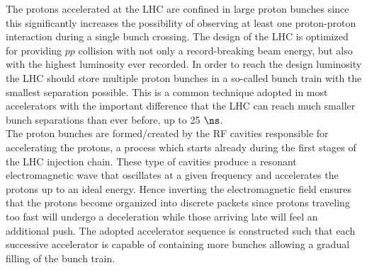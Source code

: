 The protons accelerated at the LHC are confined in large proton bunches since this significantly increases the possibility of observing at least one proton-proton interaction during a single bunch crossing. 
The design of the LHC is optimized for providing $pp$ collision with not only a record-breaking beam energy, but also with the highest luminosity ever recorded. In order to reach the design luminosity the LHC should store multiple proton bunches in a so-called bunch train with the smallest separation possible. 
This is a common technique adopted in most accelerators with the important difference that the LHC can reach much smaller bunch separations than ever before, up to 25 $\ns$.
\\
The proton bunches are formed/created by the RF cavities responsible for accelerating the protons, a process which starts already during the first stages of the LHC injection chain.
These type of cavities produce a resonant electromagnetic wave that oscillates at a given frequency and accelerates the protons up to an ideal energy.
Hence inverting the electromagnetic field ensures that the protons become organized into discrete packets since protons traveling too fast will undergo a deceleration while those arriving late will feel an additional push.
The adopted accelerator sequence is constructed such that each successive accelerator is capable of containing more bunches allowing a gradual filling of the bunch train.

